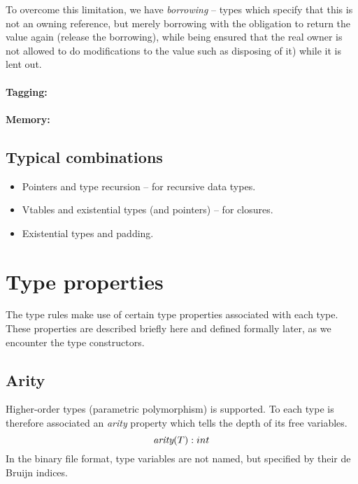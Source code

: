 \documentclass[a4paper]{report}
\newcommand\arity{{\ensuremath\textit{arity}}}
\begin{document}
To overcome this limitation, we have \emph{borrowing} -- types which
specify that this is not an owning reference, but merely borrowing
with the obligation to return the value again (release the borrowing),
while being ensured that the real owner is not allowed to do
modifications to the value such as disposing of it) while it is lent
out.


\paragraph{Tagging:}

\paragraph{Memory:}


\subsection{Typical combinations}
\begin{itemize}
\item Pointers and type recursion -- for recursive data types.
\item Vtables and existential types (and pointers) -- for closures.
\item Existential types and padding.
\end{itemize}



\section{Type properties}

The type rules make use of certain type properties associated with each type.
These properties are described briefly here and defined formally later,
as we encounter the type constructors.

\subsection{Arity}
Higher-order types (parametric polymorphism) is supported.
To each type is therefore associated
an \emph{arity} property which tells the depth of its free variables.
$$
\arity(T) : int
$$
In the binary file format, type variables are not named, but specified
by their de Bruijn indices.
\end{document}
